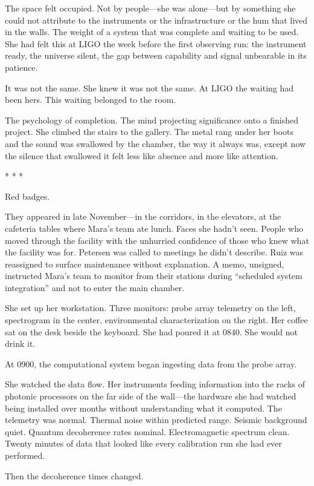 \documentclass[12pt]{article}
\newcommand{\scenebreak}{\begin{center}* * *\end{center}}
\begin{document}
The space felt occupied. Not by people---she was alone---but by something she could not attribute to the instruments or the infrastructure or the hum that lived in the walls. The weight of a system that was complete and waiting to be used. She had felt this at LIGO the week before the first observing run: the instrument ready, the universe silent, the gap between capability and signal unbearable in its patience.

It was not the same. She knew it was not the same. At LIGO the waiting had been hers. This waiting belonged to the room.

The psychology of completion. The mind projecting significance onto a finished project. She climbed the stairs to the gallery. The metal rang under her boots and the sound was swallowed by the chamber, the way it always was, except now the silence that swallowed it felt less like absence and more like attention.

\scenebreak

Red badges.

They appeared in late November---in the corridors, in the elevators, at the cafeteria tables where Mara's team ate lunch. Faces she hadn't seen. People who moved through the facility with the unhurried confidence of those who knew what the facility was for. Petersen was called to meetings he didn't describe. Ruiz was reassigned to surface maintenance without explanation. A memo, unsigned, instructed Mara's team to monitor from their stations during ``scheduled system integration'' and not to enter the main chamber.

She set up her workstation. Three monitors: probe array telemetry on the left, spectrogram in the center, environmental characterization on the right. Her coffee sat on the desk beside the keyboard. She had poured it at 0840. She would not drink it.

At 0900, the computational system began ingesting data from the probe array.

She watched the data flow. Her instruments feeding information into the racks of photonic processors on the far side of the wall---the hardware she had watched being installed over months without understanding what it computed. The telemetry was normal. Thermal noise within predicted range. Seismic background quiet. Quantum decoherence rates nominal. Electromagnetic spectrum clean. Twenty minutes of data that looked like every calibration run she had ever performed.

Then the decoherence times changed.
\end{document}
